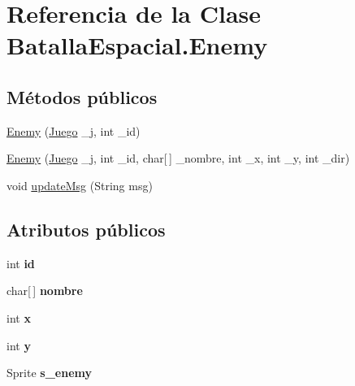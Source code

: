 \hypertarget{classBatallaEspacial_1_1Enemy}{
\section{Referencia de la Clase BatallaEspacial.Enemy}
\label{classBatallaEspacial_1_1Enemy}
}
\subsection*{Métodos públicos}
\begin{DoxyCompactItemize}
\item 
\hyperlink{classBatallaEspacial_1_1Enemy_ab12f55ec1dc5ba5332f025a64b949e25}{Enemy} (\hyperlink{classBatallaEspacial_1_1Juego}{Juego} \_\-j, int \_\-id)
\item 
\hyperlink{classBatallaEspacial_1_1Enemy_a705dcb17f7ae13bd3d129a5e6c555fd4}{Enemy} (\hyperlink{classBatallaEspacial_1_1Juego}{Juego} \_\-j, int \_\-id, char\mbox{[}$\,$\mbox{]} \_\-nombre, int \_\-x, int \_\-y, int \_\-dir)
\item 
void \hyperlink{classBatallaEspacial_1_1Enemy_a914137816d317c9dd6678eff65b1932f}{updateMsg} (String msg)
\end{DoxyCompactItemize}
\subsection*{Atributos públicos}
\begin{DoxyCompactItemize}
\item 
\hypertarget{classBatallaEspacial_1_1Enemy_aedd081ac22ac61cf0ee8e12b640fb143}{
int {\bfseries id}}
\label{classBatallaEspacial_1_1Enemy_aedd081ac22ac61cf0ee8e12b640fb143}

\item 
\hypertarget{classBatallaEspacial_1_1Enemy_ac9266d75c11c9b0e77c3640e2fe9475c}{
char\mbox{[}$\,$\mbox{]} {\bfseries nombre}}
\label{classBatallaEspacial_1_1Enemy_ac9266d75c11c9b0e77c3640e2fe9475c}

\item 
\hypertarget{classBatallaEspacial_1_1Enemy_ab1ec4c829fc566136116fe0f4e8ee51c}{
int {\bfseries x}}
\label{classBatallaEspacial_1_1Enemy_ab1ec4c829fc566136116fe0f4e8ee51c}

\item 
\hypertarget{classBatallaEspacial_1_1Enemy_ab441e983c1f8b6fdf0572d60390aaa1d}{
int {\bfseries y}}
\label{classBatallaEspacial_1_1Enemy_ab441e983c1f8b6fdf0572d60390aaa1d}

\item 
\hypertarget{classBatallaEspacial_1_1Enemy_a39221b0932fd2fcfd58b56c9b3862d35}{
Sprite {\bfseries s\_\-enemy}}
\label{classBatallaEspacial_1_1Enemy_a39221b0932fd2fcfd58b56c9b3862d35}

\end{DoxyCompactItemize}
